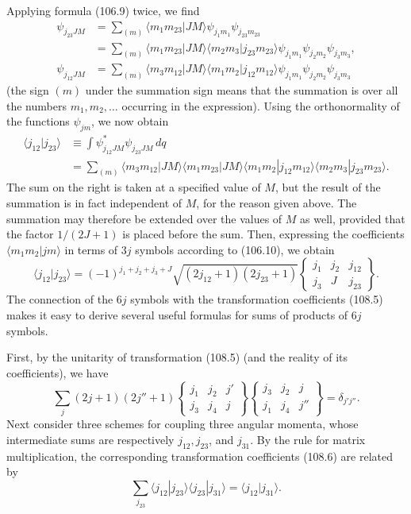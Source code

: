 Applying formula (106.9) twice, we find
\[
\begin{aligned}
\psi_{j_{23}JM}&=\sum_{(m)}\langle m_1m_{23}|JM\rangle\psi_{j_1m_1}\psi_{j_{23}m_{23}}\\
&=\sum_{(m)}\langle m_1m_{23}|JM\rangle\langle m_2m_3|j_{23}m_{23}\rangle
\psi_{j_1m_1}\psi_{j_2m_2}\psi_{j_3m_3},\\
\psi_{j_{12}JM}&=\sum_{(m)}\langle m_3m_{12}|JM\rangle\langle m_1m_2|j_{12}m_{12}\rangle
\psi_{j_1m_1}\psi_{j_2m_2}\psi_{j_3m_3}
\end{aligned}
\]
(the sign $(m)$ under the summation sign means that the summation is over all the numbers $m_1,m_2,\ldots$ occurring in the expression). Using the orthonormality of the functions $\psi_{jm}$, we now obtain
\[
\begin{aligned}
\langle j_{12}|j_{23}\rangle&\equiv\int\psi_{j_{12}JM}^{*}\psi_{j_{23}JM}\,dq\\
&=\sum_{(m)}\langle m_3m_{12}|JM\rangle\langle m_1m_{23}|JM\rangle
\langle m_1m_2|j_{12}m_{12}\rangle\langle m_2m_3|j_{23}m_{23}\rangle.
\end{aligned}
\]
The sum on the right is taken at a specified value of $M$, but the result of the summation is in fact independent of $M$, for the reason given above. The summation may therefore be extended over the values of $M$ as well, provided that the factor $1/(2J+1)$ is placed before the sum. Then, expressing the coefficients $\langle m_1m_2|jm\rangle$ in terms of $3j$ symbols according to (106.10), we obtain
\begin{equation}
\langle j_{12}|j_{23}\rangle=(-1)^{j_1+j_2+j_3+J}\sqrt{(2j_{12}+1)(2j_{23}+1)}
\left\{\begin{matrix}j_1&j_2&j_{12}\\j_3&J&j_{23}\end{matrix}\right\}.
\tag{108.6}
\end{equation}
The connection of the $6j$ symbols with the transformation coefficients (108.5) makes it easy to derive several useful formulas for sums of products of $6j$ symbols.

First, by the unitarity of transformation (108.5) (and the reality of its coefficients), we have
\begin{equation}
\sum_j(2j+1)(2j''+1)
\left\{\begin{matrix}j_1&j_2&j'\\j_3&j_4&j\end{matrix}\right\}
\left\{\begin{matrix}j_3&j_2&j\\j_1&j_4&j''\end{matrix}\right\}
=\delta_{j'j''}.
\tag{108.7}
\end{equation}
Next consider three schemes for coupling three angular momenta, whose intermediate sums are respectively $j_{12},j_{23}$, and $j_{31}$. By the rule for matrix multiplication, the corresponding transformation coefficients (108.6) are related by
\[
\sum_{j_{23}}\langle j_{12}|j_{23}\rangle\langle j_{23}|j_{31}\rangle=\langle j_{12}|j_{31}\rangle.
\]

